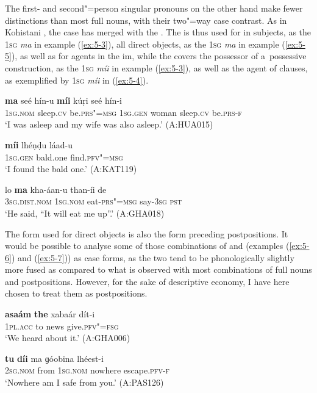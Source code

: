 The first- and second"=person singular pronouns on the other hand make fewer distinctions than most full nouns, with their two"=way case contrast. As in Kohistani \iliShina, the  case has merged with the  \citep[82]{schmidtkohistani2008}. The  is thus used for in subjects, as the \textsc{1sg} \textit{ma} in example (\ref{ex:5-3}), all direct objects, as the \textsc{1sg} \textit{ma} in example (\ref{ex:5-5}), as well as for  agents in the im, while the  covers the possessor of a~possessive construction, as the \textsc{1sg} \textit{míi} in example (\ref{ex:5-3}), as well as the agent of  clauses, as exemplified by \textsc{1sg} \textit{míi} in (\ref{ex:5-4}). 


\begin{exe}
\ex
\label{ex:5-3}
\gll \textbf{ma} seé hín-u \textbf{míi} kúṛi seé hín-i \\
	\textsc{1sg.nom} sleep.\textsc{cv} be.\textsc{prs"=msg} \textsc{1sg.gen} woman sleep.\textsc{cv} be.\textsc{prs-f} \\
\glt `I was asleep and my wife was also asleep.' (A:HUA015)

\ex
\label{ex:5-4}
\gll \textbf{míi} lhéṇḍu láad-u \\
	\textsc{1sg.gen} bald.one find.\textsc{pfv"=msg} \\
\glt `I found the bald one.' (A:KAT119)

\ex
\label{ex:5-5}
\gll lo \textbf{ma} kha-áan-u than-íi de \\
	\textsc{3sg.dist.nom} \textsc{1sg.nom} eat-\textsc{prs"=msg} say-\textsc{3sg} \textsc{pst} \\
\glt `He said, ``It will eat me up''.' (A:GHA018)
\end{exe}

The form used for direct objects is also the form preceding postpositions. It would be possible to analyse some of those combinations of  and  (examples (\ref{ex:5-6}) and (\ref{ex:5-7})) as case forms, as the two tend to be phonologically slightly more fused as compared to what is observed with most combinations of full nouns and postpositions. However, for the sake of descriptive economy, I have here chosen to treat them as postpositions. 

\begin{exe}
\ex
\label{ex:5-6}
\gll \textbf{asaám} \textbf{the} xabaár dít-i \\
	1\textsc{pl}.\textsc{acc} to news give.\textsc{pfv"=fsg} \\
\glt `We heard about it.' (A:GHA006)

\ex
\label{ex:5-7}
\gll \textbf{tu} \textbf{díi} ma ɡóobina lhéest-i \\
\textsc{2sg.nom} from \textsc{1sg.nom} nowhere escape.\textsc{pfv-f} \\
\glt `Nowhere am I safe from you.' (A:PAS126)
\end{exe}

